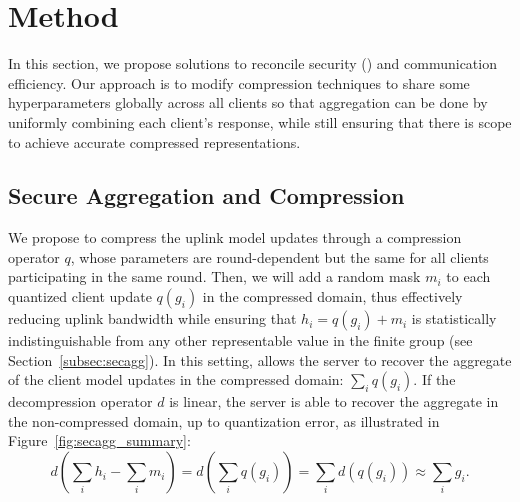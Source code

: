 \section{Method}
\label{sec:method}

In this section, we propose solutions to 
reconcile security (\SecAgg) and communication efficiency.
Our approach is to modify compression techniques to share some hyperparameters globally across all clients so that aggregation can be done by uniformly combining each client's response, while still ensuring that there is scope to achieve accurate compressed representations.

\subsection{Secure Aggregation and Compression}
\label{subsec:secagg_comp}
We propose to compress the uplink model updates through a compression operator $q$, whose parameters are round-dependent but the same for all clients participating in the same round. 
Then, we will add a random mask $m_i$ to each quantized client update $q(g_i)$ in the compressed domain, thus effectively reducing uplink bandwidth while ensuring that $h_i = q(g_i) + m_i$ is statistically indistinguishable from any other representable value in the finite group (see Section~\ref{subsec:secagg}). 
In this setting, \SecAgg allows the server to recover the aggregate of the client model updates in the compressed domain: $\sum_i q(g_i)$.
If the decompression operator $d$ is linear, the server is able to recover the aggregate in the non-compressed domain, up to quantization error, as illustrated in Figure~\ref{fig:secagg_summary}:
\begin{equation*}\textstyle
    d\left(\sum_i h_i - \sum_i m_i\right) = d\left(\sum_i q(g_i)\right) =\sum_i d(q(g_i)) \approx \sum_i g_i.
\end{equation*}
